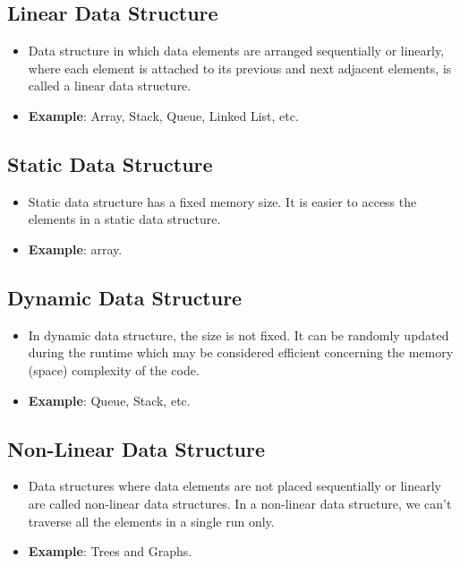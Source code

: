 \subsection{Linear Data Structure \cite{gfg-data-structures}}
\begin{itemize}
    \item Data structure in which data elements are arranged sequentially or linearly, where each element is attached to its previous and next adjacent elements, is called a linear data structure.
    
    \item \textbf{Example}: Array, Stack, Queue, Linked List, etc.
\end{itemize}

\subsection{Static Data Structure \cite{gfg-data-structures}}
\begin{itemize}
    \item Static data structure has a fixed memory size. It is easier to access the elements in a static data structure. 

    \item \textbf{Example}: array.
\end{itemize}

\subsection{Dynamic Data Structure \cite{gfg-data-structures}}
\begin{itemize}
    \item In dynamic data structure, the size is not fixed. It can be randomly updated during the runtime which may be considered efficient concerning the memory (space) complexity of the code.

    \item \textbf{Example}: Queue, Stack, etc.
\end{itemize}

\subsection{Non-Linear Data Structure \cite{gfg-data-structures}}
\begin{itemize}
    \item Data structures where data elements are not placed sequentially or linearly are called non-linear data structures. In a non-linear data structure, we can’t traverse all the elements in a single run only.
    
    \item \textbf{Example}: Trees and Graphs.
\end{itemize}

